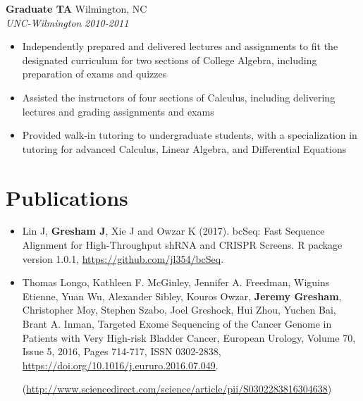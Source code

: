 \documentclass[10pt]{article}
\begin{document}
\noindent
{\bf Graduate TA} \hfill Wilmington, NC\\
{\it UNC-Wilmington} \hfill {\it 2010-2011}
  
\begin{itemize}\raggedright
  \setlength{\itemsep}{0pt}
  
\item Independently prepared and delivered lectures and assignments to fit the designated curriculum for two sections of College Algebra, including preparation of exams and quizzes

\item Assisted the instructors of four sections of Calculus, including delivering lectures and grading assignments and exams

\item Provided walk-in tutoring to undergraduate students, with a specialization in tutoring for advanced Calculus, Linear Algebra, and Differential Equations

\end{itemize}


\section*{Publications}
\begin{itemize}\raggedright
\setlength{\itemsep}{0pt}

  \item Lin J, {\bf Gresham J}, Xie J and Owzar K (2017). bcSeq: Fast Sequence
  Alignment for High-Throughput shRNA and CRISPR Screens. R package version
  1.0.1, \href{https://github.com/jl354/bcSeq}{https://github.com/jl354/bcSeq}.

  \item Thomas Longo, Kathleen F. McGinley, Jennifer A. Freedman,
  Wiguins Etienne, Yuan Wu, Alexander Sibley, Kouros Owzar, {\bf Jeremy Gresham},
  Christopher Moy, Stephen Szabo, Joel Greshock, Hui Zhou, Yuchen Bai,
  Brant A. Inman, Targeted Exome Sequencing of the Cancer Genome in Patients
  with Very High-risk Bladder Cancer, European Urology, Volume 70, Issue 5,
   2016, Pages 714-717, ISSN 0302-2838,
   \href{https://doi.org/10.1016/j.eururo.2016.07.049}{https://doi.org/10.1016/j.eururo.2016.07.049}.

   (\href{http://www.sciencedirect.com/science/article/pii/S0302283816304638}{http://www.sciencedirect.com/science/article/pii/S0302283816304638})


\end{itemize}
\end{document}
